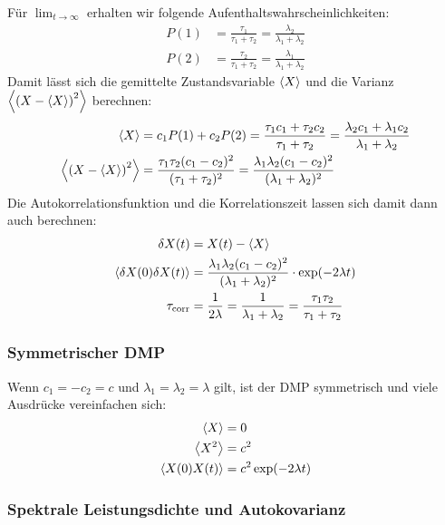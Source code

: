 \documentclass[main.tex]{subfiles}
\begin{document}
Für \( \lim_{t \to \infty} \) erhalten wir folgende
Aufenthaltswahrscheinlichkeiten:
\begin{align}
	P(1) & = \frac{\tau_1}{\tau_1 + \tau_2} =
	\frac{\lambda_2 }{\lambda_1 +
		\lambda_2}
	\\
	P(2) & = \frac{\tau_2}{\tau_1 + \tau_2} =
	\frac{\lambda_1 }{\lambda_1 +
		\lambda_2}
\end{align}
Damit lässt sich die gemittelte Zustandsvariable \(\expval{X}\) und die Varianz
\(\expval{\qty(X - \expval{X})^2}\) berechnen:
\begin{align}
	\expval{X}                      & = c_1 P(1) + c_2 P(2) = \frac{\tau_1
		c_1 + \tau_2
		c_2}{\tau_1 + \tau_2} = \frac{\lambda_2 c_1 + \lambda_1
		c_2}{\lambda_1 +
		\lambda_2}
	\\
	\expval{\qty(X - \expval{X})^2} & = \frac{\tau_1 \tau_2
		(c_1-c_2)^2}{(\tau_1 + \tau_2)^2} = \frac{\lambda_1 \lambda_2
		(c_1-c_2)^2}{(\lambda_1 + \lambda_2)^2}
\end{align}
Die Autokorrelationsfunktion und die Korrelationszeit lassen sich damit dann
auch berechnen:
\begin{align}
	\delta X(t)                     & = X(t) - \expval{X}
	\\
	\expval{\delta X(0)\delta X(t)} & = \frac{\lambda_1 \lambda_2
		(c_1-c_2)^2}{(\lambda_1 + \lambda_2)^2} \cdot \exp(-2\lambda t)
	\\
	\tau_\mathrm{corr}              & = \frac{1}{2\lambda} =
	\frac{1}{\lambda_1 +
		\lambda_2} = \frac{\tau_1 \tau_2}{\tau_1 + \tau_2}
\end{align}

\subsubsection*{Symmetrischer DMP}

Wenn \(c_1=-c_2=c\) und \(\lambda_1 = \lambda_2 = \lambda\) gilt, ist der DMP
symmetrisch und viele Ausdrücke vereinfachen sich:
\begin{align}
	\expval{X}        & = 0                     \\
	\expval{X^2}      & = c^2                   \\
	\expval{X(0)X(t)} & = c^2 \exp(-2\lambda t)
\end{align}

\subsubsection*{Spektrale Leistungsdichte und Autokovarianz}
\end{document}
